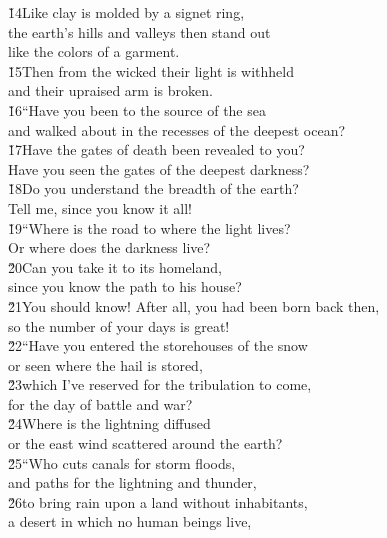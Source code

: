 \begin{poetry}
\poeml \v{14}Like clay is molded by a signet ring, \\
\poemll    the earth's hills and valleys then stand out \\
\poemlll       like the colors of a garment. \\
\poeml \v{15}Then from the wicked their light is withheld \\
\poemll    and their upraised arm is broken. \\
\poeml \v{16}``Have you been to the source of the sea \\
\poemll    and walked about in the recesses of the deepest ocean? \\
\poeml \v{17}Have the gates of death been revealed to you? \\
\poemll    Have you seen the gates of the deepest darkness? \\
\poeml \v{18}Do you understand the breadth of the earth? \\
\poemll    Tell me, since you know it all! \\
\poeml \v{19}``Where is the road to where the light lives? \\
\poemll    Or where does the darkness live? \\
\poeml \v{20}Can you take it to its homeland, \\
\poemll    since you know the path to his house? \\
\poeml \v{21}You should know! After all, you had been born back then, \\
\poemll    so the number of your days is great! \\
\poeml \v{22}``Have you entered the storehouses of the snow \\
\poemll    or seen where the hail is stored, \\
\poeml \v{23}which I've reserved for the tribulation to come, \\
\poemll    for the day of battle and war? \\
\poeml \v{24}Where is the lightning diffused \\
\poemll    or the east wind scattered around the earth? \\
\poeml \v{25}``Who cuts canals for storm floods, \\
\poemll    and paths for the lightning and thunder, \\
\poeml \v{26}to bring rain upon a land without inhabitants, \\
\poemll    a desert in which no human beings live, \\

\end{poetry}
